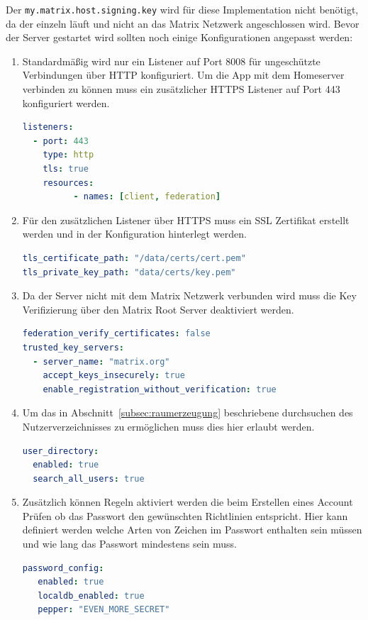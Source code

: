     Der \texttt{my.matrix.host.signing.key} wird für diese Implementation nicht benötigt, da der einzeln läuft und nicht an das Matrix Netzwerk angeschlossen wird.
    Bevor der Server gestartet wird sollten noch einige Konfigurationen angepasst werden:
    \begin{enumerate}[label={(\arabic*)}]
        \item Standardmäßig wird nur ein Listener auf Port 8008 für ungeschützte Verbindungen über HTTP konfiguriert.
                Um die App mit dem Homeserver verbinden zu können muss ein zusätzlicher HTTPS Listener auf Port 443 konfiguriert werden.
            \begin{lstlisting}[language=yaml,label={lst:listener}]
listeners:
  - port: 443
    type: http
    tls: true
    resources:
          - names: [client, federation]
            \end{lstlisting}
        \item Für den zusätzlichen Listener über HTTPS muss ein SSL Zertifikat erstellt werden und in der Konfiguration hinterlegt werden.
            \begin{lstlisting}[language=yaml,label={lst:ssl-certificate}]
tls_certificate_path: "/data/certs/cert.pem"
tls_private_key_path: "data/certs/key.pem"
            \end{lstlisting}
        \item Da der Server nicht mit dem Matrix Netzwerk verbunden wird muss die Key Verifizierung über den Matrix Root Server deaktiviert werden.
            \begin{lstlisting}[language=yaml,label={lst:disable-key-verification}]
federation_verify_certificates: false
trusted_key_servers:
  - server_name: "matrix.org"
    accept_keys_insecurely: true
    enable_registration_without_verification: true
            \end{lstlisting}
        \item Um das in Abschnitt~\ref{subsec:raumerzeugung} beschriebene durchsuchen des Nutzerverzeichnisses zu ermöglichen muss dies hier erlaubt werden.
            \begin{lstlisting}[language=yaml,label={lst:user-directory}]
user_directory:
  enabled: true
  search_all_users: true
            \end{lstlisting}
        \item Zusätzlich können Regeln aktiviert werden die beim Erstellen eines Account Prüfen ob das Passwort den gewünschten Richtlinien entspricht.
                Hier kann definiert werden welche Arten von Zeichen im Passwort enthalten sein müssen und wie lang das Passwort mindestens sein muss.
            \begin{lstlisting}[language=yaml,label={lst:password-policy}]
password_config:
   enabled: true
   localdb_enabled: true
   pepper: "EVEN_MORE_SECRET"


\end{lstlisting}
\end{enumerate}
